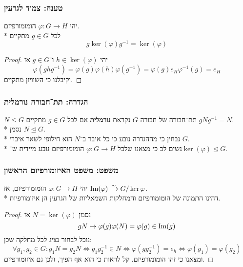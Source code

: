 \subsubsection{טענה: צמוד לגרעין}
יהי $\varphi : G \to H$ הומומורפיזם. \\*
לכל $g \in G$ מתקיים
\[
	g \ker(\varphi) g^{-1} = \ker(\varphi)
\]
\begin{proof}
	יהי $h \in \ker(\varphi)$ ו־$g \in G$ אז
	\[
		\varphi(g h g^{-1}) = \varphi(g) \varphi(h) \varphi(g^{-1}) = \varphi(g) e_H \varphi^{-1}(g) = e_H
	\]
	וקיבלנו כי השוויון מתקיים.
\end{proof}

\subsubsection{הגדרה: תת־חבורה נורמלית}
$N \le G$ תת־חבורה של חבורה $G$ נקראת \textbf{נורמלית} אם לכל $g \in G$ מתקיים $g N g^{-1} = N$. \\*
נסמן $N \trianglelefteq G$. \\*
נבחין כי מההגדרה נובע כי כל איבר ב־$N$ הוא חילופי לשאר איברי $G$. \\*
נשים לב כי מצאנו שלכל $\varphi : G \to H$ הומומורפיזם נובע מיידית ש־$\ker(\varphi) \trianglelefteq G$.

\subsubsection{משפט: משפט האיזומורפיזם הראשון}
יהי $\varphi : G \to H$ הומומורפיזם, אז $\operatorname{Im}(\varphi) \xrightarrow{\sim} G/\ker{\varphi}$. \\*
דהינו התמונה של הומומורפיזם והמחלקות השמאליות של הגרעין הן איזומורפיות.
\begin{proof}
	נסמן $N = \ker(\varphi)$ אז
	\[
		g N \mapsto \varphi(g) \varphi(N) = \varphi(g) \in \operatorname{Im}(g)
	\]
	נוכל לבחור נציג לכל מחלקה שכן:
	\[
		\forall g_1, g_2 \in G : g_1 N = g_2 N \iff g_1 g_2^{-1} \in N \iff \varphi(g g_2^{-1}) = e_h \iff \varphi(g_1) = \varphi(g_2)
	\]
	ומצאנו כי זהו הומומורפיזם. קל לראות כי הוא אף הפיך, ולכן גם איזומורפיזם.
\end{proof}


